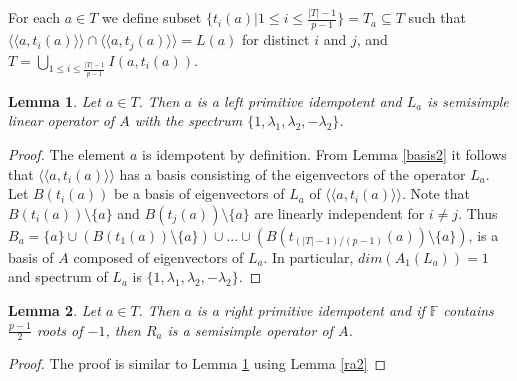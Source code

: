 \documentclass[12pt]{article}
\newcommand\F{\mathbb{F}}
\newcommand\gam{\gamma}
\newcommand\lm{\lambda}
\newcommand\la{\langle}
\newcommand\ra{\rangle}
\newcommand\lla{\la\!\la}
\newcommand\rra{\ra\!\ra}
\newtheorem{lem}{Lemma}
\begin{document}
For each $a\in T$ we define subset $\{t_i(a)|1\leq i\leq\frac{|T|-1}{p-1}\}=T_a\subseteq T$ such that $\lla a,t_i(a)\rra\cap\lla a,t_j(a)\rra=L(a)$ for distinct $i$ and $j$, and $T=\bigcup_{1\leq i\leq\frac{|T|-1}{p-1}} I(a,t_i(a))$.

\begin{lem}\label{spec}
Let $a\in T$. Then $a$ is a left primitive idempotent and $L_a$ is semisimple linear operator of $A$ with the spectrum $\{1,\lm_1,\lm_2,-\lm_2\}$.  
\end{lem}
\begin{proof}
The element $a$ is idempotent by definition. From Lemma \ref{basis2} it follows that $\lla a, t_i(a)\rra$ has a basis consisting of the eigenvectors of the operator $L_a$.
Let $B(t_i(a))$ be a basis of eigenvectors of $L_a$ of $\lla a, t_i(a)\rra$. Note that $B(t_i(a))\setminus\{a\}$ and $B(t_j(a))\setminus\{a\}$ are linearly independent for $i\neq j$. Thus $B_a=\{a\}\cup (B(t_1(a))\setminus\{a\})\cup...\cup(B(t_{(|T|-1)/(p-1)}(a))\setminus\{a\})$, is a basis of $A$ composed of eigenvectors of $L_a$. In particular, $dim(A_1(L_a))=1$ and spectrum of $L_a$ is $\{1,\lm_1,\lm_2,-\lm_2\}$. 

\end{proof}
\begin{lem}\label{spec2}
Let $a\in T$. Then $a$ is a right primitive idempotent and if $\F$ contains $\frac{p-1}{2}$ roots of $-1$, then $R_a$ is a semisimple operator of $A$.  
\end{lem}
\begin{proof}
   The proof is similar to Lemma \ref{spec} using Lemma \ref{ra2}
\end{proof}
\end{document}

